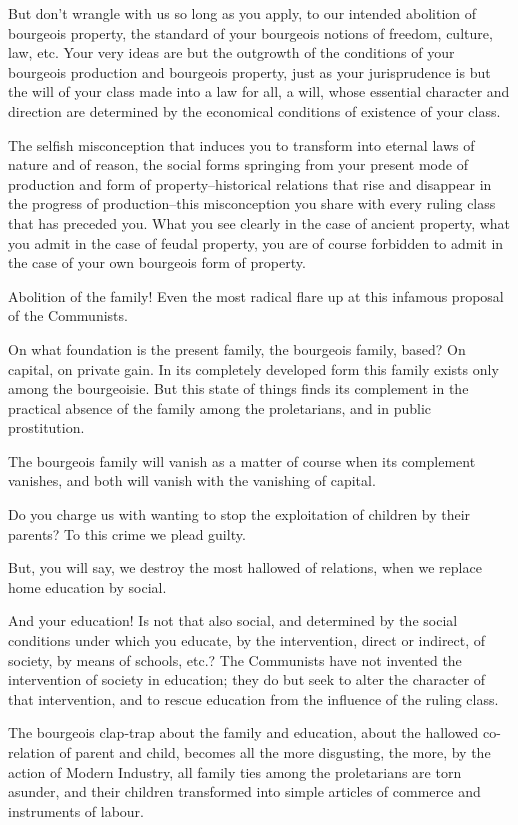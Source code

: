 \documentclass[11pt]{book}
\begin{document}
But don't wrangle with us so long as you apply, to our intended
abolition of bourgeois property, the standard of your bourgeois
notions of freedom, culture, law, etc.  Your very ideas are but
the outgrowth of the conditions of your bourgeois production and
bourgeois property, just as your jurisprudence is but the will of
your class made into a law for all, a will, whose essential
character and direction are determined by the economical
conditions of existence of your class.

The selfish misconception that induces you to transform into
eternal laws of nature and of reason, the social forms
springing from your present mode of production and form of
property--historical relations that rise and disappear in the
progress of production--this misconception you share with every
ruling class that has preceded you.  What you see clearly in the
case of ancient property, what you admit in the case of feudal
property, you are of course forbidden to admit in the case of
your own bourgeois form of property.

Abolition of the family!  Even the most radical flare up at this
infamous proposal of the Communists.

On what foundation is the present family, the bourgeois family,
based?  On capital, on private gain.  In its completely developed
form this family exists only among the bourgeoisie.  But this
state of things finds its complement in the practical absence of
the family among the proletarians, and in public prostitution.

The bourgeois family will vanish as a matter of course when its
complement vanishes, and both will vanish with the vanishing of
capital.

Do you charge us with wanting to stop the exploitation of
children by their parents?  To this crime we plead guilty.

But, you will say, we destroy the most hallowed of relations,
when we replace home education by social.

And your education!  Is not that also social, and determined by the
social conditions under which you educate, by the intervention,
direct or indirect, of society, by means of schools, etc.?  The
Communists have not invented the intervention of society in
education; they do but seek to alter the character of that
intervention, and to rescue education from the influence of the
ruling class.

The bourgeois clap-trap about the family and education, about
the hallowed co-relation of parent and child, becomes all the
more disgusting, the more, by the action of Modern Industry, all
family ties among the proletarians are torn asunder, and their
children transformed into simple articles of commerce and
instruments of labour.
\end{document}

